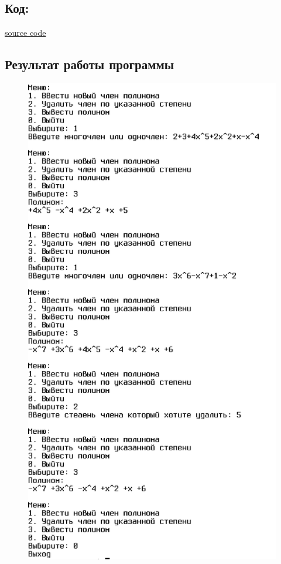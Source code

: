 \documentclass[14pt,a4paper]{article}
\begin{document}
\subsection{Код:}

\href{https://raw.githubusercontent.com/John1400800/stuff/refs/heads/main/c_learning/home_works/task16_3.cpp}{source code}
\newpage
\subsection{Результат работы программы}
\begin{figure}[h]
    \includegraphics[height=0.5\textheight]{data/demo16_3.png}
\end{figure}
\end{document}
